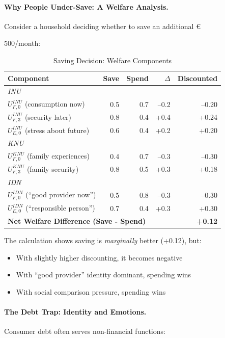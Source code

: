 \paragraph{Why People Under-Save: A Welfare Analysis.}

Consider a household deciding whether to save an additional \euro{500/month:

\begin{table}[htbp]
\centering
\caption{Saving Decision: Welfare Components}
\label{tab:saving-welfare}
\small
\renewcommand{\arraystretch}{1.2}
\begin{tabular}{@{}lrrrr@{}}
\toprule
\textbf{Component} & \textbf{Save} & \textbf{Spend} & \textbf{$\Delta$} & \textbf{Discounted} \\
\midrule
\multicolumn{5}{l}{\textit{INU}} \\
$U^{INU}_{F,0}$ (consumption now) & 0.5 & 0.7 & --0.2 & --0.20 \\
$U^{INU}_{F,3}$ (security later) & 0.8 & 0.4 & +0.4 & +0.24 \\
$U^{INU}_{E,0}$ (stress about future) & 0.6 & 0.4 & +0.2 & +0.20 \\
\midrule
\multicolumn{5}{l}{\textit{KNU}} \\
$U^{KNU}_{F,0}$ (family experiences) & 0.4 & 0.7 & --0.3 & --0.30 \\
$U^{KNU}_{F,3}$ (family security) & 0.8 & 0.5 & +0.3 & +0.18 \\
\midrule
\multicolumn{5}{l}{\textit{IDN}} \\
$U^{IDN}_{F,0}$ (``good provider now'') & 0.5 & 0.8 & --0.3 & --0.30 \\
$U^{IDN}_{E,0}$ (``responsible person'') & 0.7 & 0.4 & +0.3 & +0.30 \\
\midrule
\multicolumn{4}{l}{\textbf{Net Welfare Difference (Save - Spend)}} & \textbf{+0.12} \\
\bottomrule
\end{tabular}
\end{table}

The calculation shows saving is \emph{marginally} better (+0.12), but:
\begin{itemize}
\item With slightly higher discounting, it becomes negative
\item With ``good provider'' identity dominant, spending wins
\item With social comparison pressure, spending wins
\end{itemize}

\paragraph{The Debt Trap: Identity and Emotions.}
Consumer debt often serves non-financial functions:

}
